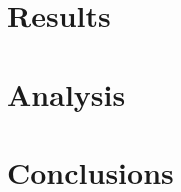 \documentclass[conference]{IEEEtran}
\begin{document}
\section{Results}
\section{Analysis}
\section{Conclusions}



\end{document}

